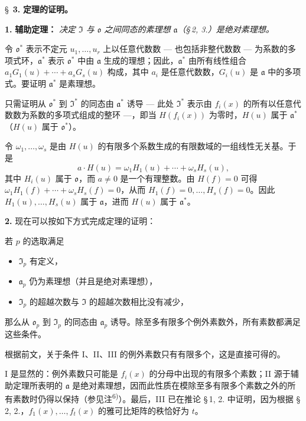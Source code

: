 \bigskip
\S~\textbf{3.}
\textbf{定理的证明。}

\smallskip

\noindent\textbf{1.} \textbf{辅助定理：}
\textit{决定 $\mathfrak{I}$ 与 $\mathfrak{o}$ 之间同态的素理想 $\mathfrak{a}$（\S\,2, 3.）是绝对素理想。}

令 $\mathfrak{o}^*$ 表示不定元 $u_1,\ldots,u_r$ 上以任意代数数 --- 也包括非整代数数 --- 为系数的多项式环，$\mathfrak{a}^*$ 表示 $\mathfrak{o}^*$ 中由 $\mathfrak{a}$ 生成的理想；因此，$\mathfrak{a}^*$ 由所有线性组合 $a_1 G_1(u) + \cdots + a_s G_s(u)$ 构成，其中 $a_i$ 是任意代数数，$G_i(u)$ 是 $\mathfrak{a}$ 中的多项式。要证明 $\mathfrak{a}^*$ 是素理想。

只需证明从 $\mathfrak{o}^*$ 到 $\mathfrak{I}^*$ 的同态由 $\mathfrak{a}^*$ 诱导 --- 此处 $\mathfrak{I}^*$ 表示由 $f_i(x)$ 的所有以任意代数数为系数的多项式组成的整环 ---，即当 $H(f_i(x))$ 为零时，$H(u)$ 属于 $\mathfrak{a}^*$（$H(u)$ 属于 $\mathfrak{o}^*$）。

令 $\omega_1,\ldots,\omega_s$ 是由 $H(u)$ 的有限多个系数生成的有限数域的一组线性无关基。于是
\[
a \cdot H(u) = \omega_1 H_1(u) + \cdots + \omega_s H_s(u),
\]
其中 $H_i(u)$ 属于 $\mathfrak{o}$，而 $a \neq 0$ 是一个有理整数。由 $H(f) = 0$ 可得 $\omega_1 H_1(f) + \cdots + \omega_s H_s(f) = 0$，从而 $H_1(f) = 0,\ldots, H_s(f) = 0$。因此 $H_1(u),\ldots,H_s(u)$ 属于 $\mathfrak{a}$，进而 $H(u)$ 属于 $\mathfrak{a}^*$。

\medskip\noindent\textbf{2.}
现在可以按如下方式完成定理的证明：

若 $p$ 的选取满足
\begin{itemize}
\item[I.] $\mathfrak{I}_p$ 有定义，
\item[II.] $\mathfrak{a}_p$ 仍为素理想（并且是绝对素理想），
\item[III.] $\mathfrak{I}_p$ 的超越次数与 $\mathfrak{I}$ 的超越次数相比没有减少，
\end{itemize}
那么从 $\mathfrak{o}_p$ 到 $\mathfrak{I}_p$ 的同态由 $\mathfrak{a}_p$ 诱导。除至多有限多个例外素数外，所有素数都满足这些条件。

根据前文，关于条件 I、II、III 的例外素数只有有限多个，这是直接可得的。

I 是显然的：例外素数只可能是 $f_i(x)$ 的分母中出现的有限多个素数；II 源于辅助定理所表明的 $\mathfrak{a}$ 是绝对素理想，因而此性质在模除至多有限多个素数之外的所有素数时仍得以保持（参见注\textsuperscript{6)}）。最后，III 已在推论 \S\,1, 2. 中证明，因为根据 \S\,2, 2.，$f_1(x),\ldots,f_t(x)$ 的雅可比矩阵的秩恰好为 $t$。

